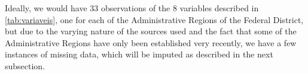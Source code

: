 \documentclass[conference]{IEEEtran}
\begin{document}
Ideally, we would have 33 observations of the 8 variables described in \ref{tab:variaveis}, one for each of the Administrative Regions of the Federal District, but due to the varying nature of the sources used and the fact that some of the Administrative Regions have only been established very recently, we have a few instances of missing data, which will be imputed as described in the next subsection.





\end{document}
